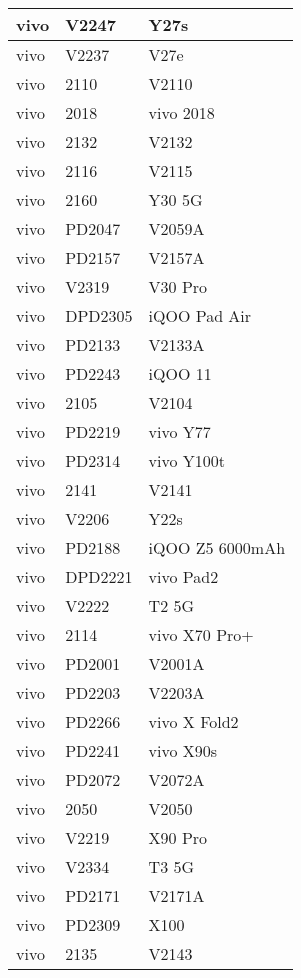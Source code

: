 \begin{tabularx}{\linewidth}{|l|X|X|}
        vivo & V2247 & Y27s \\ \hline
        vivo & V2237 & V27e \\ \hline
        vivo & 2110 & V2110 \\ \hline
        vivo & 2018 & vivo 2018 \\ \hline
        vivo & 2132 & V2132 \\ \hline
        vivo & 2116 & V2115 \\ \hline
        vivo & 2160 & Y30 5G \\ \hline
        vivo & PD2047 & V2059A \\ \hline
        vivo & PD2157 & V2157A \\ \hline
        vivo & V2319 & V30 Pro \\ \hline
        vivo & DPD2305 & iQOO Pad Air \\ \hline
        vivo & PD2133 & V2133A \\ \hline
        vivo & PD2243 & iQOO 11 \\ \hline
        vivo & 2105 & V2104 \\ \hline
        vivo & PD2219 & vivo Y77 \\ \hline
        vivo & PD2314 & vivo Y100t \\ \hline
        vivo & 2141 & V2141 \\ \hline
        vivo & V2206 & Y22s \\ \hline
        vivo & PD2188 & iQOO Z5 6000mAh \\ \hline
        vivo & DPD2221 & vivo Pad2 \\ \hline
        vivo & V2222 & T2 5G \\ \hline
        vivo & 2114 & vivo X70 Pro+ \\ \hline
        vivo & PD2001 & V2001A \\ \hline
        vivo & PD2203 & V2203A \\ \hline
        vivo & PD2266 & vivo X Fold2 \\ \hline
        vivo & PD2241 & vivo X90s \\ \hline
        vivo & PD2072 & V2072A \\ \hline
        vivo & 2050 & V2050 \\ \hline
        vivo & V2219 & X90 Pro \\ \hline
        vivo & V2334 & T3 5G \\ \hline
        vivo & PD2171 & V2171A \\ \hline
        vivo & PD2309 & X100 \\ \hline
        vivo & 2135 & V2143 \\ \hline

\end{tabularx}
